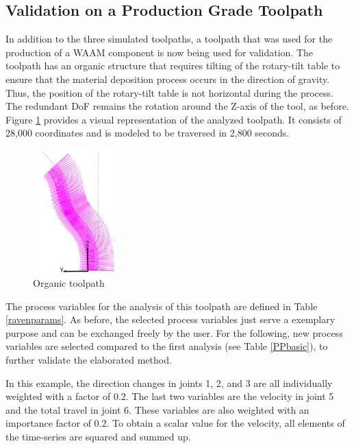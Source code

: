 \subsection{Validation on a Production Grade Toolpath}\label{RG}
In addition to the three simulated toolpaths, a toolpath that was used for the production of a \acrshort{WAAM} component is now being used for validation. The toolpath has an organic structure that requires tilting of the rotary-tilt table to ensure that the material deposition process occurs in the direction of gravity. Thus, the position of the rotary-tilt table is not horizontal during the process. The redundant \acrshort{DoF} remains the rotation around the Z-axis of the tool, as before. Figure \ref{rav} provides a visual representation of the analyzed toolpath. It consists of 28,000 coordinates and is modeled to be traversed in 2,800 seconds.

\begin{figure}[H]
	\centerline{\includegraphics[width=0.3\textwidth]{figures/raven.png}}
	\caption{Organic toolpath \cite{Reisch.2023}}
	\label{rav}
\end{figure}

The process variables for the analysis of this toolpath are defined in Table \ref{ravenparams}. 
As before, the selected process variables just serve a exemplary purpose and can be exchanged freely by the user. For the following, new process variables are selected compared to the first analysis (see Table \ref{PPbasic}), to further validate the elaborated method.

In this example, the direction changes in joints 1, 2, and 3 are all individually weighted with a factor of 0.2. The last two variables are the velocity in joint 5 and the total travel in joint 6. These variables are also weighted with an importance factor of 0.2. To obtain a scalar value for the velocity, all elements of the time-series are squared and summed up. 

